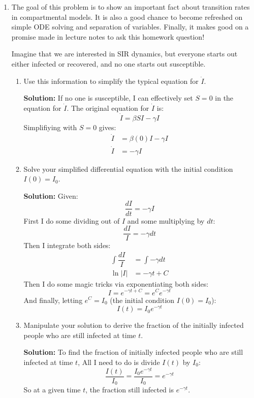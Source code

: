 \documentclass[11pt]{article}
\newenvironment{solution}{\par\noindent\begingroup\color{BrickRed}\textbf{Solution:} }{\par\endgroup}
\begin{document}
\begin{enumerate}
\clearpage

\item The goal of this problem is to show an important fact about transition rates in compartmental models.
It is also a good chance to become refreshed on simple ODE solving and separation of variables.
Finally, it makes good on a promise made in lecture notes to ask this homework question!
	
Imagine that we are interested in SIR dynamics,
but everyone starts out either infected or recovered,
and no one starts out susceptible.
\begin{enumerate}[label=\alph*.]
	\item Use this information to simplify the typical equation for $\dot{I}$.
		\begin{solution} \newline
		If no one is susceptible, I can effectively set $S=0$ in the equation for $\dot{I}$.
		The original equation for $\dot{I}$ is: 
		$$\dot{I} = \beta S I - \gamma I$$
		Simplifiying with $S=0$ gives:
			\begin{align*}
			\dot{I} &= \beta (0) I - \gamma I \\
			\dot{I} &= - \gamma I
			\end{align*}
		\end{solution}

	\item Solve your simplified differential equation with the initial condition $I(0) = I_0$.
		\begin{solution} \newline
			Given:
			$$\dfrac{dI}{dt} = -\gamma I$$
			First I do some dividing out of $I$ and some multiplying by $dt$:
			$$\dfrac{dI}{I} = -\gamma dt$$
			Then I integrate both sides:
			\begin{align*}
			\int \dfrac{dI}{I} &= \int -\gamma dt \\
			\ln|I| &= -\gamma t + C
			\end{align*}
			Then I do some magic tricks via exponentiating both sides:
			$$I = e^{-\gamma t + C} = e^C e^{-\gamma t}$$
			And finally, letting $e^C = I_0$ (the initial condition $I(0) = I_0$):
			$$I(t) = I_0 e^{-\gamma t}$$
		\end{solution}

	\item Manipulate your solution to derive the fraction of the initially infected people who are still infected at time $t$.
		\begin{solution} \newline \newline
			To find the fraction of initially infected people who are still infected at time $t$,
			All I need to do is divide $I(t)$ by $I_0$:
			$$\frac{I(t)}{I_0} = \frac{I_0 e^{-\gamma t}}{I_0} = e^{-\gamma t}$$
			So at a given time $t$, the fraction still infected is $e^{-\gamma t}$.
		\end{solution}


\end{enumerate}
\end{enumerate}
\end{document}
